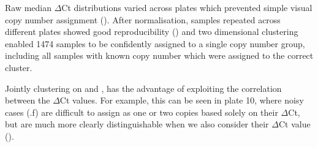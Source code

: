 Raw median $\Delta$Ct distributions varied across plates which prevented simple visual copy number assignment ().
After normalisation, samples repeated across different plates showed good reproducibility () and two dimensional clustering enabled 1474 samples to be confidently assigned to a single copy number group, including all samples with known copy number which were assigned to the correct cluster.

Jointly clustering on  and , has the advantage of exploiting the correlation between the $\Delta$Ct values. 
For example, this can be seen in plate 10, where noisy cases (.f) are difficult to assign as one or two copies based solely on their  $\Delta$Ct, but are much more clearly distinguishable when we also consider their  $\Delta$Ct value ().




